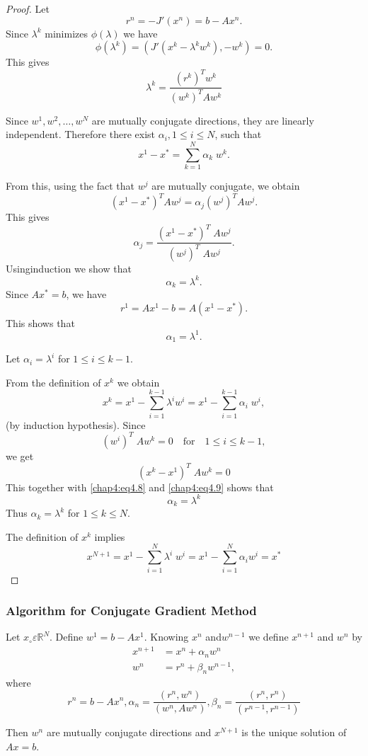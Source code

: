 \begin{proof}
Let 
$$
r^n=-J'(x^n)=b-Ax^n.
$$
Since $\lambda^k$ minimizes $\phi(\lambda)$ we have 
$$
\phi(\lambda^k)=(J'(x^k-\lambda^kw^k),-w^k)=0.
$$
This gives
\begin{equation}\label{chap4:eq4.8}
\lambda^k=\frac{(r^k)^Tw^k}{(w^k)^TAw^k}
\end{equation}

Since $w^1, w^2,\ldots,w^N$ are mutually conjugate directions, they
are linearly independent. Therefore there exist $\alpha_i, 1\leq i\leq
N$, such that 
$$
x^1-x^*=\sum\limits_{k=1}^N\alpha_k\; w^k.
$$

From this, using the fact that $w^j$ are mutually conjugate, we obtain
$$
(x^1-x^*)^T Aw^j=\alpha_j(w^j)^TAw^j.
$$
This gives 
\begin{equation}\label{chap4:eq4.9}
\alpha_j=\frac{(x^1-x^*)^T\;Aw^j}{(w^j)^T\;Aw^j}.
\end{equation}
Using\pageoriginale induction we show that 
$$
\alpha_k=\lambda^k.
$$
Since $Ax^*=b$, we have 
$$
r^1=Ax^1-b=A(x^1-x^*).
$$
This shows that
$$
\alpha_1=\lambda^1.
$$

Let $\alpha_i=\lambda^i$ for $1\leq i\leq k-1$.

\noindent From the definition of $x^k$ we obtain
$$
x^k=x^1-\sum\limits_{i=1}^{k-1}\lambda^iw^i=x^1-\sum\limits_{i=1}^{k-1}
\alpha_i \;w^i,
$$
(by induction hypothesis). Since 
$$
(w^i)^T\;Aw^k=0\quad\text{for}\quad 1\leq i\leq k-1,
$$
we get
$$
(x^k-x^1)^T\; Aw^k=0
$$
This together with \eqref{chap4:eq4.8} and \eqref{chap4:eq4.9} shows
that 
$$
\alpha_k=\lambda^k
$$
Thus $\alpha_k=\lambda^k$ for $1\leq k\leq N$.

The definition of $x^k$ implies
$$
x^{N+1}=x^1-\sum\limits_{i=1}^N\lambda^i \;w^i=x^1-
\sum\limits_{i=1}^N\alpha_iw^i=x^*
$$
\end{proof}

\subsubsection{\bf Algorithm for Conjugate Gradient Method}

\begin{THM}\label{chap4:THM3}
Let $x_\circ\varepsilon\mathbb{R}^N$. Define $w^1=b-Ax^1$. Knowing
$x^n$ and\pageoriginale $w^{n-1}$ we define $x^{n+1}$ and $w^n$ by 
\begin{align*}
x^{n+1}&= x^n+\alpha_nw^n\\
w^n &= r^n+\beta_nw^{n-1},
\end{align*}
where
$$
r^n=b-Ax^n, \alpha_n=\frac{(r^n,w^n)}{(w^n,Aw^n)},\beta_n=
\frac{(r^n,r^n)}{(r^{n-1},r^{n-1})}
$$

Then $w^n$ are mutually conjugate directions and $x^{N+1}$ is the
unique solution of $Ax=b$. 
\end{THM}

